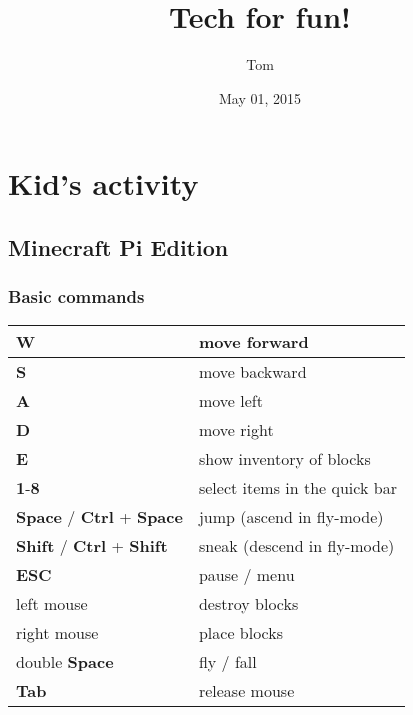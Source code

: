 \documentclass[letterpaper,10pt,english]{sphinxmanual}
\title{Tech for fun!}
\date{May 01, 2015}
\author{Tom}
\begin{document}
\maketitle
\tableofcontents
{}\label{index::doc}



\chapter{Kid's activity}
\label{index:kid-s-activity}\label{index:tech-for-fun}

\section{Minecraft Pi Edition}
\label{kid/minecraft::doc}\label{kid/minecraft:minecraft-pi-edition}

\subsection{Basic commands}
\label{kid/minecraft:basic-commands}
\begin{tabulary}{\linewidth}{|L|L|}
\hline

\textbf{W}
 & 
move forward
\\
\hline
\textbf{S}
 & 
move backward
\\
\hline
\textbf{A}
 & 
move left
\\
\hline
\textbf{D}
 & 
move right
\\
\hline
\textbf{E}
 & 
show inventory of blocks
\\
\hline
\textbf{1}-\textbf{8}
 & 
select items in the quick bar
\\
\hline
\textbf{Space} / \textbf{Ctrl} + \textbf{Space}
 & 
jump (ascend in fly-mode)
\\
\hline
\textbf{Shift} / \textbf{Ctrl} + \textbf{Shift}
 & 
sneak (descend in fly-mode)
\\
\hline
\textbf{ESC}
 & 
pause / menu
\\
\hline
left mouse
 & 
destroy blocks
\\
\hline
right mouse
 & 
place blocks
\\
\hline
double \textbf{Space}
 & 
fly / fall
\\
\hline
\textbf{Tab}
 & 
release mouse
\\
\hline\end{tabulary}
\end{document}
